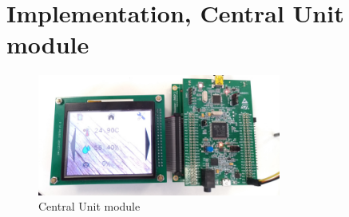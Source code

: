 \section{Implementation, Central Unit module}

\begin{figure}[H]
	\centering
	\includegraphics[width=8cm,keepaspectratio]{img/CentralUnit}
	\caption{Central Unit module}
	\label{fig:CentralUnit}
\end{figure}

